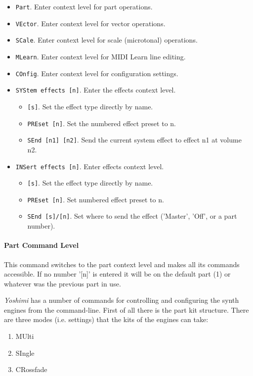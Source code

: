    \begin{itemize}
      \item \texttt{Part}. Enter context level for part operations.
      \item \texttt{VEctor}. Enter context level for vector operations.
      \item \texttt{SCale}. Enter context level for scale (microtonal)
      operations.
      \item \texttt{MLearn}. Enter context level for MIDI Learn line editing.
      \item \texttt{COnfig}. Enter context level for configuration settings.
      \item \texttt{SYStem effects [n]}. Enter the effects context level.
      \begin{itemize}
         \item \texttt{[s]}.  Set the effect type directly by name.
         \item \texttt{PREset [n]}. Set the numbered effect preset to n.
         \item \texttt{SEnd [n1] [n2]}. Send the current system effect to
         effect n1 at volume n2.
      \end{itemize}
      \item \texttt{INSert effects [n]}. Enter effects context level.
      \begin{itemize}
         \item \texttt{[s]}. Set the effect type directly by name.
         \item \texttt{PREset [n]}. Set numbered effect preset to n.
         \item \texttt{SEnd [s]/[n]}. Set where to send the effect
            ('Master', 'Off', or a part number).
      \end{itemize}
   \end{itemize}

\paragraph{Part Command Level}
\label{paragraph:command_line_context_level_part}

   This command switches to the part context level and makes all its commands
   accessible.  If no number '[n]' is entered it will be on the default part
   (1) or whatever was the previous part in use.

   \textsl{Yoshimi} has a number of commands for controlling and configuring
   the synth engines from the command-line. First of all there is the part
   kit structure. There are three modes (i.e. settings) that the kits of the
   engines can take:
\pagebreak
   \begin{enumerate}
      \item MUlti
      \item SIngle
      \item CRossfade
   \end{enumerate}

